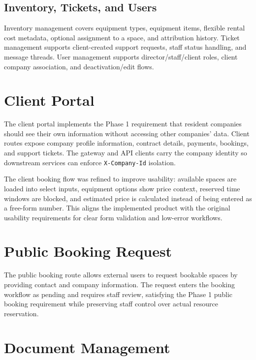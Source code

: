 \documentclass[12pt,a4paper]{report}
\begin{document}
\subsection{Inventory, Tickets, and Users}
\label{subsec:inventory-tickets-users}

Inventory management covers equipment types, equipment items, flexible rental
cost metadata, optional assignment to a space, and attribution history. Ticket
management supports client-created support requests, staff status handling, and
message threads. User management supports director/staff/client roles, client
company association, and deactivation/edit flows.

\section{Client Portal}
\label{sec:client-portal}

The client portal implements the Phase 1 requirement that resident companies
should see their own information without accessing other companies' data. Client
routes expose company profile information, contract details, payments, bookings,
and support tickets. The gateway and API clients carry the company identity so
downstream services can enforce \texttt{X-Company-Id} isolation.

The client booking flow was refined to improve usability: available spaces are
loaded into select inputs, equipment options show price context, reserved time
windows are blocked, and estimated price is calculated instead of being entered
as a free-form number. This aligns the implemented product with the original
usability requirements for clear form validation and low-error workflows.

\section{Public Booking Request}
\label{sec:public-booking}

The public booking route allows external users to request bookable spaces by
providing contact and company information. The request enters the booking
workflow as pending and requires staff review, satisfying the Phase 1 public
booking requirement while preserving staff control over actual resource
reservation.

\section{Document Management}
\label{sec:document-management}
\end{document}
